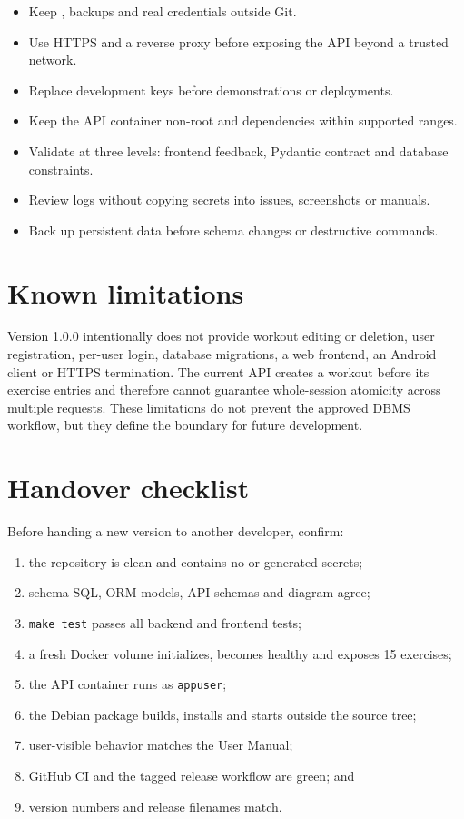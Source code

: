 \documentclass[11pt,a4paper]{article}
\newcommand{\filepath}[1]{\path{#1}}
\begin{document}
\begin{itemize}[itemsep=0.35em]
  \item Keep \filepath{.env}, backups and real credentials outside Git.
  \item Use HTTPS and a reverse proxy before exposing the API beyond a trusted network.
  \item Replace development keys before demonstrations or deployments.
  \item Keep the API container non-root and dependencies within supported ranges.
  \item Validate at three levels: frontend feedback, Pydantic contract and database constraints.
  \item Review logs without copying secrets into issues, screenshots or manuals.
  \item Back up persistent data before schema changes or destructive commands.
\end{itemize}

\section{Known limitations}

Version 1.0.0 intentionally does not provide workout editing or deletion, user
registration, per-user login, database migrations, a web frontend, an Android
client or HTTPS termination. The current API creates a workout before its
exercise entries and therefore cannot guarantee whole-session atomicity across
multiple requests. These limitations do not prevent the approved DBMS workflow,
but they define the boundary for future development.

\newpage
\section{Handover checklist}

Before handing a new version to another developer, confirm:

\begin{enumerate}
  \item the repository is clean and contains no \filepath{.env} or generated secrets;
  \item schema SQL, ORM models, API schemas and diagram agree;
  \item \texttt{make test} passes all backend and frontend tests;
  \item a fresh Docker volume initializes, becomes healthy and exposes 15 exercises;
  \item the API container runs as \texttt{appuser};
  \item the Debian package builds, installs and starts outside the source tree;
  \item user-visible behavior matches the User Manual;
  \item GitHub CI and the tagged release workflow are green; and
  \item version numbers and release filenames match.
\end{enumerate}
\end{document}
